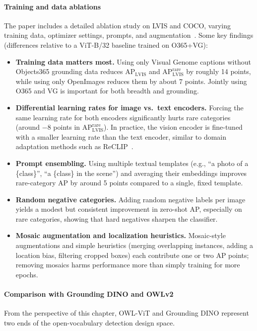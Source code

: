 \begin{enrichment}
\begin{enrichment}
		\paragraph{Training and data ablations}
		The paper includes a detailed ablation study on LVIS and COCO, varying training data, optimizer settings, prompts, and augmentation~\cite{minderer2022_owlvit}.
		Some key findings (differences relative to a ViT-B/32 baseline trained on O365+VG):
		\begin{itemize}
			\item \textbf{Training data matters most.}
			Using only Visual Genome captions without Objects365 grounding data reduces $\text{AP}_{\text{LVIS}}$ and $\text{AP}_{\text{LVIS}}^{\text{rare}}$ by roughly 14 points, while using only OpenImages reduces them by about 7 points.
			Jointly using O365 and VG is important for both breadth and grounding.
			\item \textbf{Differential learning rates for image vs.\ text encoders.}
			Forcing the same learning rate for both encoders significantly hurts rare categories (around \(-8\) points in $\text{AP}_{\text{LVIS}}^{\text{rare}}$).
			In practice, the vision encoder is fine-tuned with a smaller learning rate than the text encoder, similar to domain adaptation methods such as ReCLIP~\cite{hu2023_reclip}.
			\item \textbf{Prompt ensembling.}
			Using multiple textual templates (e.g., ``a photo of a \{class\}'', ``a \{class\} in the scene'') and averaging their embeddings improves rare-category AP by around 5 points compared to a single, fixed template.
			\item \textbf{Random negative categories.}
			Adding random negative labels per image yields a modest but consistent improvement in zero-shot AP, especially on rare categories, showing that hard negatives sharpen the classifier.
			\item \textbf{Mosaic augmentation and localization heuristics.}
			Mosaic-style augmentations and simple heuristics (merging overlapping instances, adding a location bias, filtering cropped boxes) each contribute one or two AP points; removing mosaics harms performance more than simply training for more epochs.
		\end{itemize}
		
		\paragraph{Comparison with Grounding DINO and OWLv2}
		From the perspective of this chapter, OWL-ViT and Grounding DINO represent two ends of the open-vocabulary detection design space.
		

\end{enrichment}
\end{enrichment}
